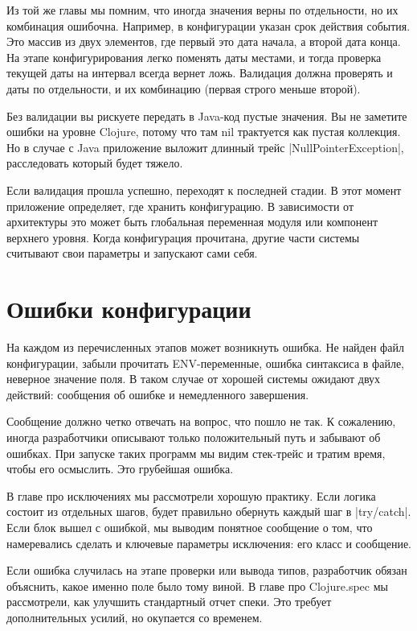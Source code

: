 Из той же главы мы помним, что иногда значения верны по отдельности, но их
комбинация ошибочна. Например, в конфигурации указан срок действия события. Это
массив из двух элементов, где первый это дата начала, а второй дата конца. На
этапе конфигурирования легко поменять даты местами, и тогда проверка текущей
даты на интервал всегда вернет ложь. Валидация должна проверять и даты по
отдельности, и их комбинацию (первая строго меньше второй).

Без валидации вы рискуете передать в Java-код пустые значения. Вы не заметите
ошибки на уровне Clojure, потому что там nil трактуется как пустая коллекция. Но
в случае с Java приложение выложит длинный трейс \spverb|NullPointerException|,
расследовать который будет тяжело.

Если валидация прошла успешно, переходят к последней стадии. В этот момент
приложение определяет, где хранить конфигурацию. В зависимости от архитектуры
это может быть глобальная переменная модуля или компонент верхнего уровня. Когда
конфигурация прочитана, другие части системы считывают свои параметры и
запускают сами себя.

\section{Ошибки конфигурации}

На каждом из перечисленных этапов может возникнуть ошибка. Не найден файл
конфигурации, забыли прочитать ENV-переменные, ошибка синтаксиса в файле,
неверное значение поля. В таком случае от хорошей системы ожидают двух действий:
сообщения об ошибке и немедленного завершения.

Сообщение должно четко отвечать на вопрос, что пошло не так. К сожалению, иногда
разработчики описывают только положительный путь и забывают об ошибках. При
запуске таких программ мы видим стек-трейс и тратим время, чтобы его
осмыслить. Это грубейшая ошибка.

В главе про исключениях мы рассмотрели хорошую практику. Если логика состоит из
отдельных шагов, будет правильно обернуть каждый шаг в \spverb|try/catch|. Если блок
вышел с ошибкой, мы выводим понятное сообщение о том, что намеревались сделать и
ключевые параметры исключения: его класс и сообщение.

Если ошибка случилась на этапе проверки или вывода типов, разработчик обязан
объяснить, какое именно поле было тому виной. В главе про Clojure.spec мы
рассмотрели, как улучшить стандартный отчет спеки. Это требует дополнительных
усилий, но окупается со временем.


